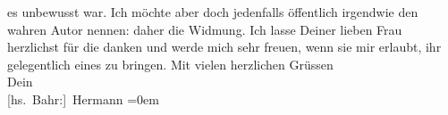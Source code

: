 \begin{ledgroupsized}[t]{13cm}
               es unbewusst war. Ich möchte aber doch jedenfalls öffentlich irgendwie den wahren
               Autor nennen: daher die Widmung.\pend
           \pstart
           Ich lasse Deiner lieben Frau
               herzlichst für die \label{K_L01633_1v}\label{K_L01633_1h} danken und werde mich
               sehr freuen, wenn sie mir erlaubt, ihr gelegentlich eines zu bringen.\pend
           \pstart
           Mit vielen herzlichen Grüssen{\\[\baselineskip]}Dein{\\[\baselineskip]}\spacefill\mbox{{[}hs. Bahr:{]} Hermann}\pend
           \leftskip=0em{}
         
         \endnumbering{}\end{ledgroupsized}  \newcommand{\dateiname}{L01633}\newcommand{\titel}{Hermann Bahr an Arthur Schnitzler, 16. 10. 1906}\newcommand{\editorInnen}{ Kurt Ifkovits,  Martin Anton Müller}
      